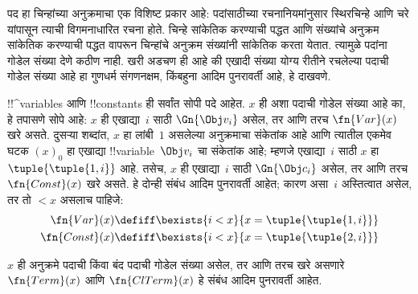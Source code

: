 \documentclass[../../../include/open-logic-section]{subfiles}
\begin{document}

\begin{explain}
पद हा चिन्हांच्या अनुक्रमाचा एक विशिष्ट प्रकार आहे: पदांसाठीच्या
रचनानियमांनुसार स्थिरचिन्हे आणि चरे यांपासून त्याची विगमनाधारित
रचना होते. चिन्हे सांकेतिक करण्याची पद्धत आणि संख्यांचे अनुक्रम
सांकेतिक करण्याची पद्धत वापरून चिन्हांचे अनुक्रम संख्यांनी सांकेतिक
करता येतात. त्यामुळे पदांना गोडेल संख्या देणे कठीण नाही. खरी
अडचण ही आहे की एखादी संख्या योग्य रीतीने रचलेल्या पदाची गोडेल
संख्या आहे हा गुणधर्म संगणनक्षम, किंबहुना आदिम पुनरावर्ती आहे, हे दाखवणे.
\end{explain}

!!^{variable}s आणि !!{constant}s ही सर्वांत सोपी पदे आहेत. $x$ ही
अशा पदाची गोडेल संख्या आहे का, हे तपासणे सोपे आहे:
$x$ ही एखाद्या~$i$ साठी $\Gn{\Obj v_i}$ असेल, तर आणि तरच
$\fn{Var}(x)$ खरे असते. दुसऱ्या शब्दांत, $x$ हा लांबी~$1$
असलेल्या अनुक्रमाचा संकेतांक आहे आणि त्यातील एकमेव घटक $(x)_0$
हा एखाद्या !!{variable}~$\Obj v_i$ चा संकेतांक आहे; म्हणजे एखाद्या~$i$
साठी $x$ हा $\tuple{\tuple{1, i}}$ आहे. तसेच, $x$ ही एखाद्या~$i$
साठी $\Gn{\Obj c_i}$ असेल, तर आणि तरच $\fn{Const}(x)$ खरे असते.
हे दोन्ही संबंध आदिम पुनरावर्ती आहेत; कारण असा~$i$ अस्तित्वात
असेल, तर तो $< x$ असलाच पाहिजे:
\begin{align*}
  \fn{Var}(x) & \defiff \bexists{i<x}{x = \tuple{\tuple{1, i}}}\\
  \fn{Const}(x) & \defiff \bexists{i<x}{x = \tuple{\tuple{2, i}}}
\end{align*}

\begin{prop}
$x$ ही अनुक्रमे पदाची किंवा बंद पदाची गोडेल संख्या असेल, तर आणि तरच
खरे असणारे $\fn{Term}(x)$ आणि $\fn{ClTerm}(x)$ हे संबंध आदिम पुनरावर्ती आहेत.
\end{prop}
\end{document}
